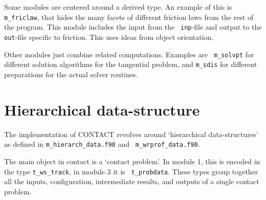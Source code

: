 \documentclass[12pt]{report}
\begin{document}
Some modules are centered around a derived type. An example of this is {\tt
m\_friclaw}, that hides the many facets of different friction laws from the
rest of the program. This module includes the input from the {\tt
inp}-file and output to the {\tt out}-file specific to friction. This uses
ideas from object orientation.

Other modules just combine related computations. Examples are {\tt
m\_solvpt} for different solution algorithms for the tangential problem,
and {\tt m\_sdis} for different preparations for the actual solver
routines.

\section{Hierarchical data-structure}

The implementation of CONTACT revolves around `hierarchical
data-structures' as defined in {\tt m\_\-hie\-rarch\_\-data.f90} and {\tt
m\_wrprof\_data.f90}.

The main object in contact is a `contact problem'. In module 1, this is
encoded in the type {\tt t\_ws\_\-track}, in module 3 it is {\tt
t\_probdata}. These types group together all the inputs, configuration,
intermediate results, and outputs of a single contact problem. 
\end{document}
